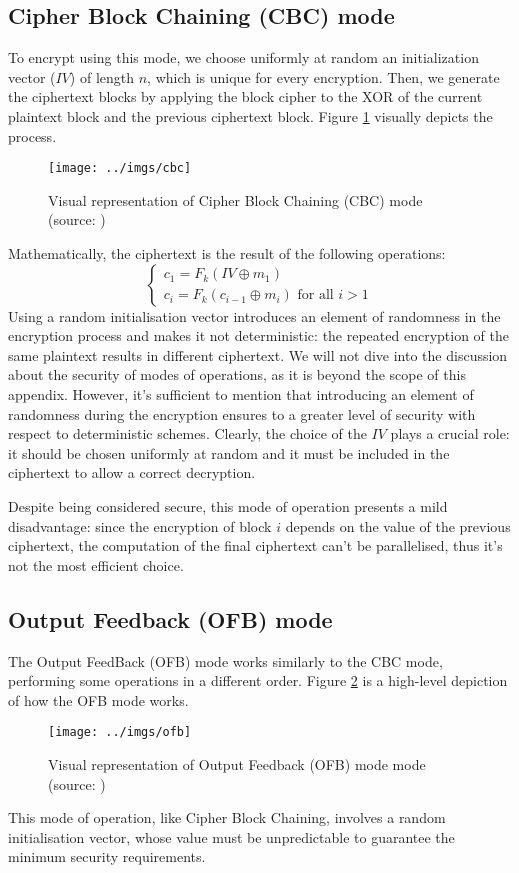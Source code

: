 \documentclass[12pt,a4paper]{book}
\theoremstyle{definition}
\begin{document}
	\subsection{Cipher Block Chaining (CBC) mode}
	To encrypt using this mode, we choose uniformly at random an initialization vector ($IV$) of length $n$, which is unique for every encryption. Then, we generate the ciphertext blocks by applying the block cipher to the XOR of the current plaintext block and the previous ciphertext block. Figure \ref{fig:cbc} visually depicts the process.
	\begin{figure}[!ht]
		\centering
		\texttt{[image: ../imgs/cbc]}
		\captionsetup{width=.55\linewidth}
		\caption{Visual representation of Cipher Block Chaining (CBC) mode (source: \cite{Katz2007})}
		\label{fig:cbc}
	\end{figure}
	Mathematically, the ciphertext is the result of the following operations:
	\[
	\begin{cases}
		c_1 = F_k(IV \oplus m_1)\\
		c_i = F_k(c_{i-1}\oplus m_i) \text{ for all } i>1
	\end{cases}
	\]
	Using a random initialisation vector introduces an element of randomness in the encryption process and makes it not deterministic: the repeated encryption of the same plaintext results in different ciphertext. 
	We will not dive into the discussion about the security of modes of operations, as it is beyond the scope of this appendix. However, it's sufficient to mention that introducing an element of randomness during the encryption ensures to a greater level of security with respect to deterministic schemes. Clearly, the choice of the $IV$ plays a crucial role: it should be chosen uniformly at random and it must be included in the ciphertext to allow a correct decryption.
	
	Despite being considered secure, this mode of operation presents a mild disadvantage: since the encryption of block $i$ depends on the value of the previous ciphertext, the computation of the final ciphertext can't be parallelised, thus it's not the most efficient choice.
 	\subsection{Output Feedback (OFB) mode}
 	The Output FeedBack (OFB) mode works similarly to the CBC mode, performing some operations in a different order. Figure \ref{fig:ofb} is a high-level depiction of how the OFB mode works.
 	\begin{figure}[!ht]
 		\centering
 		\texttt{[image: ../imgs/ofb]}
 		\captionsetup{width=.55\linewidth}
 		\caption{Visual representation of Output Feedback (OFB) mode mode (source: \cite{Katz2007})}
 		\label{fig:ofb}
 	\end{figure}
 	This mode of operation, like Cipher Block Chaining, involves a random initialisation vector, whose value must be unpredictable to guarantee the minimum security requirements.
 	
\end{document}

